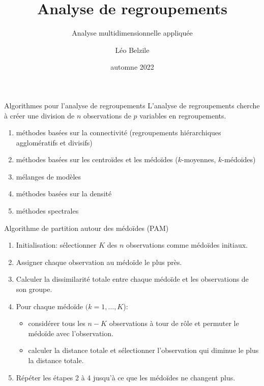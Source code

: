\documentclass[
  ignorenonframetext,
]{beamer}
\title{Analyse de regroupements}
\subtitle{Analyse multidimensionnelle appliquée}
\author{Léo Belzile}
\date{automne 2022}
\institute{HEC Montréal}
\providecommand{\tightlist}{%
  \setlength{\itemsep}{0pt}\setlength{\parskip}{0pt}}\usepackage{longtable,booktabs,array}
\begin{document}
\frame{\titlepage}
\ifdefined\Shaded\renewenvironment{Shaded}{\begin{tcolorbox}[boxrule=0pt, borderline west={3pt}{0pt}{shadecolor}, breakable, enhanced, frame hidden, interior hidden, sharp corners]}{\end{tcolorbox}}\fi

\begin{frame}{Algorithmes pour l'analyse de regroupements}
\protect\hypertarget{algorithmes-pour-lanalyse-de-regroupements}{}
L'analyse de regroupements cherche à créer une division de \(n\)
observations de \(p\) variables en regroupements.

\begin{enumerate}
\tightlist
\item
  méthodes basées sur la connectivité (regroupements hiérarchiques
  agglomératifs et divisifs)
\item
  méthodes basées sur les centroïdes et les médoïdes (\(k\)-moyennes,
  \(k\)-médoides)
\item
  mélanges de modèles
\item
  méthodes basées sur la densité
\item
  méthodes spectrales
\end{enumerate}
\end{frame}

\begin{frame}{Algorithme de partition autour des médoïdes (PAM)}
\protect\hypertarget{algorithme-de-partition-autour-des-muxe9douxefdes-pam}{}
\begin{enumerate}
\tightlist
\item
  Initialisation: sélectionner \(K\) des \(n\) observations comme
  médoïdes initiaux.
\item
  Assigner chaque observation au médoïde le plus près.
\item
  Calculer la dissimilarité totale entre chaque médoïde et les
  observations de son groupe.
\item
  Pour chaque médoïde \((k=1, \ldots, K\)):

  \begin{itemize}
  \tightlist
  \item
    considérer tous les \(n-K\) observations à tour de rôle et permuter
    le médoïde avec l'observation.\\
  \item
    calculer la distance totale et sélectionner l'observation qui
    diminue le plus la distance totale.
  \end{itemize}
\item
  Répéter les étapes 2 à 4 jusqu'à ce que les médoïdes ne changent plus.
\end{enumerate}
\end{frame}
\end{document}
